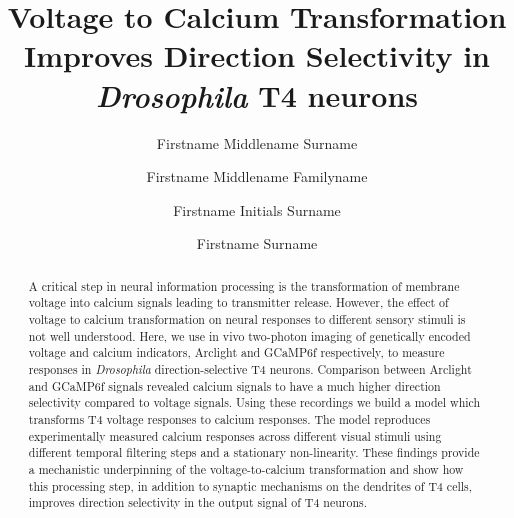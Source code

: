 \documentclass[9pt,lineno]{elife}
\title{Voltage to Calcium Transformation Improves Direction Selectivity in \textit{Drosophila} T4 neurons}
\author[1*]{Firstname Middlename Surname}
\author[1,2\authfn{1}\authfn{3}]{Firstname Middlename Familyname}
\author[2\authfn{1}\authfn{4}]{Firstname Initials Surname}
\author[2*]{Firstname Surname}
\affil[1]{Max Planck Institute of Neurobiology, Martinsried, Germany}
\begin{document}
\maketitle

\begin{abstract}
A critical step in neural information processing is the transformation of membrane voltage into calcium signals leading to transmitter release. However, the effect of voltage to calcium transformation on neural responses to different sensory stimuli is not well understood. Here, we use in vivo two-photon imaging of genetically encoded voltage and calcium indicators, Arclight and GCaMP6f respectively, to measure responses in \textit{Drosophila} direction-selective T4 neurons. Comparison between Arclight and GCaMP6f signals revealed calcium signals to have a much higher direction selectivity compared to voltage signals. Using these recordings we build a model which transforms T4 voltage responses to calcium responses. The model reproduces experimentally measured calcium responses across different visual stimuli using different temporal filtering steps and a stationary non-linearity. These findings provide a mechanistic underpinning of the voltage-to-calcium transformation and show how this processing step, in addition to synaptic mechanisms on the dendrites of T4 cells, improves direction selectivity in the output signal of T4 neurons.


\end{abstract}
\end{document}
